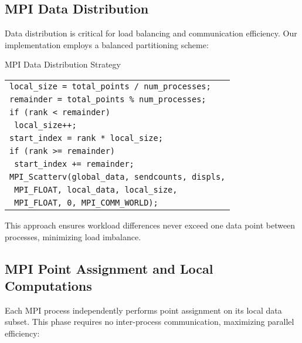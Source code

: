 \documentclass[10pt,a4paper,twocolumn]{article}
\makeatletter
\newcounter{alglineno}
\newenvironment{algtabular}{%
\setcounter{alglineno}{0}%
\begin{tabular}{@{\stepcounter{alglineno}\makebox[1.2em][r]{\tiny\thealglineno:}\hspace{0.2em}}l@{}}%
}{%
\end{tabular}%
}
\makeatother
\begin{document}
\subsection{MPI Data Distribution}

Data distribution is critical for load balancing and communication efficiency. Our implementation employs a balanced partitioning scheme:

\begin{algorithm}[H]
\caption{MPI Data Distribution Strategy}
\label{alg:mpi_distribution}
\begin{algtabular}
\texttt{local\_size = total\_points / num\_processes;} \\
\texttt{remainder = total\_points \% num\_processes;} \\
\texttt{if (rank < remainder)} \\
\texttt{  local\_size++;} \\
\texttt{start\_index = rank * local\_size;} \\
\texttt{if (rank >= remainder)} \\
\texttt{  start\_index += remainder;} \\
\texttt{MPI\_Scatterv(global\_data, sendcounts, displs,} \\
\texttt{            MPI\_FLOAT, local\_data, local\_size,} \\
\texttt{            MPI\_FLOAT, 0, MPI\_COMM\_WORLD);} \\
\end{algtabular}
\end{algorithm}

This approach ensures workload differences never exceed one data point between processes, minimizing load imbalance.

\subsection{MPI Point Assignment and Local Computations}

Each MPI process independently performs point assignment on its local data subset. This phase requires no inter-process communication, maximizing parallel efficiency:
\end{document}
